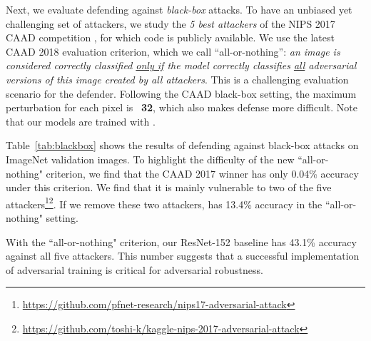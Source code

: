 \documentclass[10pt,twocolumn,letterpaper]{article}
\begin{document}
Next, we evaluate defending against \emph{black-box} attacks.
To have an unbiased yet challenging set of attackers, we study the \emph{5 best attackers} of the NIPS 2017 CAAD competition \cite{Kurakin2018}, for which code is publicly available.
We use the latest CAAD 2018 evaluation criterion, which we call ``all-or-nothing'': \emph{an image is considered correctly classified \underline{only if} the model correctly classifies \underline{all} adversarial versions of this image created by all attackers}. This is a challenging evaluation scenario for the defender. Following the CAAD black-box setting, the maximum perturbation for each pixel is ~\textbf{32}, which also makes defense more difficult. 
Note that our models are trained with .

Table~\ref{tab:blackbox} shows the results of defending against black-box attacks on ImageNet validation images. 
To highlight the difficulty of the new ``all-or-nothing" criterion, we find that the CAAD 2017 winner \cite{Liao2018} has only 0.04\% accuracy under this criterion. We find that it is mainly vulnerable to two of the five attackers\footnote{\fontsize{6pt}{1em}\selectfont \url{https://github.com/pfnet-research/nips17-adversarial-attack}}\footnote{\fontsize{6pt}{1em}\url{https://github.com/toshi-k/kaggle-nips-2017-adversarial-attack}}. If we remove these two attackers, \cite{Liao2018} has 13.4\% accuracy in the ``all-or-nothing" setting.

With the ``all-or-nothing" criterion, our ResNet-152 baseline has 43.1\% accuracy against all five attackers. This number suggests that a successful implementation of adversarial training is critical for adversarial robustness. 
\end{document}
